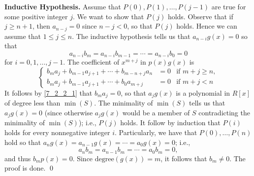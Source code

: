 \begin{enumerate}
      \textbf{Inductive Hypothesis.} Assume that $P(0), P(1), \ldots, P(j-1)$
      are true for some positive integer $j$. We want to show that $P(j)$ holds.
      Observe that if $j \ge n + 1$, then $a_{n - j} = 0$ since $n - j < 0$, so
      that $P(j)$ holds. Hence we can assume that $1 \le j \le n$. The inductive
      hypothesis tells us that $a_{n-i}g(x) = 0$ so that
      \begin{equation} \label{7_2_2_1}
         a_{n-i}b_m = a_{n-i}b_{m-1} = \cdots = a_{n-i}b_0 = 0
      \end{equation}
      for $i = 0, 1, \ldots, j - 1$. The coefficient of $x^{m+j}$ in $p(x)g(x)$
      is
      \begin{equation*}
         \left\{
            \begin{array}{lcl}
               b_ma_j + b_{m-1}a_{j+1} + \cdots + b_{m-n+j}a_n &= 0 & \text{if }
                  m + j \ge n,\\
               b_ma_j + b_{m-1}a_{j+1} + \cdots + b_0a_{m+j} &= 0 & \text{if }
                  m + j < n
            \end{array} \right.
      \end{equation*}
      It follows by \eqref{7_2_2_1} that $b_ma_j = 0$, so that $a_jg(x)$ is a
      polynomial in $R[x]$ of degree less than $\min(S)$. The minimality of
      $\min(S)$ tells us that $a_jg(x) = 0$ (since otherwise $a_jg(x)$ would be
      a member of $S$ contradicting the minimality of $\min(S)$); i.e., $P(j)$
      holds. It follow by induction that $P(i)$ holds for every nonnegative
      integer $i$. Particularly, we have that $P(0), \ldots, P(n)$ hold so
      that $a_ng(x) = a_{n-1}g(x) = \cdots = a_0g(x) = 0$; i.e.,
      $$a_{n}b_m = a_{n-1}b_m = \cdots = a_{0}b_m = 0,$$
      and thus
      $b_mp(x) = 0$. Since $\text{degree}(g(x)) = m$, it follows that
      $b_m \neq 0$. The proof is done. \qed


\end{enumerate}
